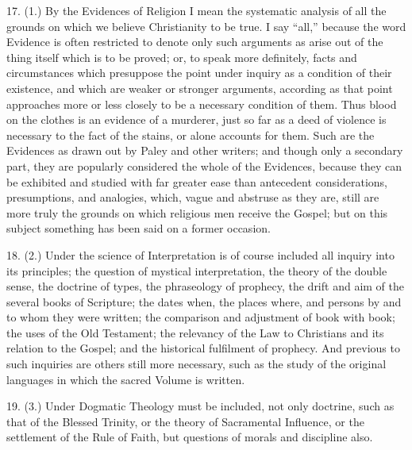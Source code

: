 17. (1.) By the Evidences of Religion I mean the systematic
analysis of all the grounds on which we believe Christianity to be
true. I say ``all,'' because the word Evidence is often
restricted to denote only such arguments as arise out of the thing
itself which is to be proved; or, to speak more definitely, facts and
circumstances which presuppose the point under inquiry as a condition
of their existence, and which are weaker or stronger arguments,
according as that point approaches more or less closely to be a
necessary condition of them. Thus blood on the clothes is an evidence
of a murderer, just so far as a deed of violence is necessary to the
fact of the stains, or alone accounts for them. Such are the Evidences
as drawn out by Paley and other writers; and though only a secondary
part, they are popularly considered the whole of the Evidences,
because they can be exhibited and studied with far greater ease than
antecedent considerations, presumptions, and analogies, which, vague
and abstruse as they are, still are more truly the grounds on which
religious men receive the Gospel; but on this subject something has
been said on a former occasion.

18. (2.) Under the science of Interpretation is of course included
all inquiry into its principles; the question of mystical
interpretation, the theory of the double sense, the doctrine of types,
the phraseology of prophecy, the drift and aim of the several books of
Scripture; the dates when, the places where, and persons by and to
whom they were written; the comparison and adjustment of book with
book; the uses of the Old Testament; the relevancy of the Law to
Christians and its relation to the Gospel; and the historical
fulfilment of prophecy. And previous to such inquiries are others
still more necessary, such as the study of the original languages in
which the sacred Volume is written.

19. (3.) Under Dogmatic Theology must be included, not only
doctrine, such as that of the Blessed Trinity, or the theory of
Sacramental Influence, or the settlement of the Rule of Faith, but
questions of morals and discipline also.

